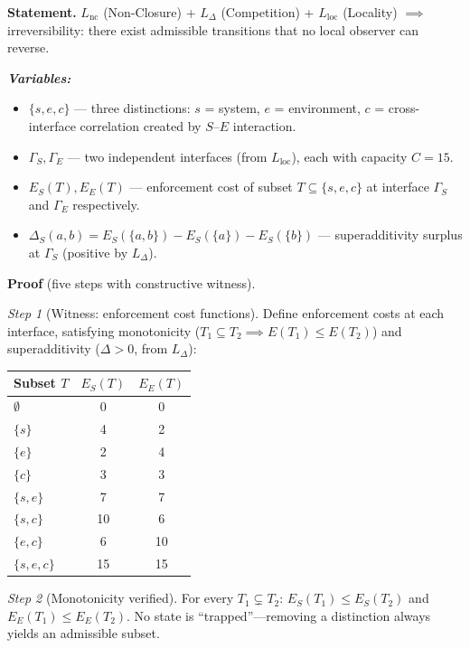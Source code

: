 \documentclass[11pt]{article}
\newenvironment{varlist}{\begin{itemize}[nosep,leftmargin=2em]}{\end{itemize}}
\begin{document}
\begin{tcolorbox}[apfbox, title={Lemma $L_{\mathrm{irr}}$ (Irreversibility)}]
\textbf{Statement.}  $L_{\mathrm{nc}}$ (Non-Closure) + $L_\Delta$ (Competition) + $L_{\mathrm{loc}}$ (Locality) $\implies$ irreversibility: there exist admissible transitions that no local observer can reverse.

\smallskip\noindent\textbf{\textit{Variables:}}
\begin{varlist}
\item $\{s, e, c\}$ --- three distinctions: $s$ = system, $e$ = environment, $c$ = cross-interface correlation created by $S$--$E$ interaction.
\item $\Gamma_S, \Gamma_E$ --- two independent interfaces (from $L_{\mathrm{loc}}$), each with capacity $C = 15$.
\item $E_S(T), E_E(T)$ --- enforcement cost of subset $T \subseteq \{s,e,c\}$ at interface $\Gamma_S$ and $\Gamma_E$ respectively.
\item $\Delta_S(a,b) = E_S(\{a,b\}) - E_S(\{a\}) - E_S(\{b\})$ --- superadditivity surplus at $\Gamma_S$ (positive by $L_\Delta$).
\end{varlist}

\smallskip\noindent\textbf{Proof} (five steps with constructive witness).

\textit{Step 1} (Witness: enforcement cost functions).  Define enforcement costs at each interface, satisfying monotonicity ($T_1 \subseteq T_2 \implies E(T_1) \le E(T_2)$) and superadditivity ($\Delta > 0$, from $L_\Delta$):

\begin{center}\small
\begin{tabular}{lcc}
\toprule
Subset $T$ & $E_S(T)$ & $E_E(T)$ \\
\midrule
$\emptyset$ & 0 & 0 \\
$\{s\}$ & 4 & 2 \\
$\{e\}$ & 2 & 4 \\
$\{c\}$ & 3 & 3 \\
$\{s,e\}$ & 7 & 7 \\
$\{s,c\}$ & 10 & 6 \\
$\{e,c\}$ & 6 & 10 \\
$\{s,e,c\}$ & 15 & 15 \\
\bottomrule
\end{tabular}
\end{center}

\textit{Step 2} (Monotonicity verified).  For every $T_1 \subsetneq T_2$: $E_S(T_1) \le E_S(T_2)$ and $E_E(T_1) \le E_E(T_2)$.  No state is ``trapped''---removing a distinction always yields an admissible subset.


\end{tcolorbox}
\end{document}
